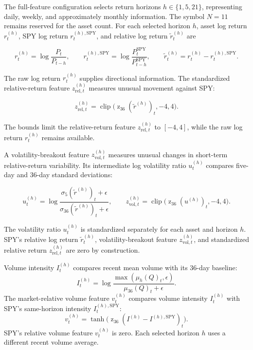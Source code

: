 The full-feature configuration selects return horizons \(h\in\{1,5,21\}\), representing daily, weekly, and approximately monthly information. The symbol \(N=11\) remains reserved for the asset count. For each selected horizon \(h\), asset log return \(r_t^{(h)}\), SPY log return \(r_t^{(h),\mathrm{SPY}}\), and relative log return \(\tilde r_t^{(h)}\) are

\begin{equation}
r_t^{(h)}=\log\frac{P_t}{P_{t-h}},\qquad
r_t^{(h),\mathrm{SPY}}=\log\frac{P_t^{\mathrm{SPY}}}{P_{t-h}^{\mathrm{SPY}}},\qquad
\tilde r_t^{(h)}=r_t^{(h)}-r_t^{(h),\mathrm{SPY}}.
\label{eq:feature-returns}
\end{equation}

The raw log return \(r_t^{(h)}\) supplies directional information. The standardized relative-return feature \(z_{\mathrm{rel},t}^{(h)}\) measures unusual movement against SPY:

\begin{equation}
z_{\mathrm{rel},t}^{(h)}=\operatorname{clip}\big(\operatorname z_{36}(\tilde r^{(h)})_t,-4,4\big).
\label{eq:feature-relative-returns}
\end{equation}

The bounds limit the relative-return feature \(z_{\mathrm{rel},t}^{(h)}\) to \([-4,4]\), while the raw log return \(r_t^{(h)}\) remains available.

A volatility-breakout feature \(z_{\mathrm{vol},t}^{(h)}\) measures unusual changes in short-term relative-return variability. Its intermediate log volatility ratio \(u_t^{(h)}\) compares five-day and 36-day standard deviations:

\begin{equation}
u_t^{(h)}=\log\frac{\sigma_5(\tilde r^{(h)})_t+\epsilon}{\sigma_{36}(\tilde r^{(h)})_t+\epsilon},\qquad
z_{\mathrm{vol},t}^{(h)}=\operatorname{clip}\big(\operatorname z_{36}(u^{(h)})_t,-4,4\big).
\label{eq:feature-vol-breakout}
\end{equation}

The volatility ratio \(u_t^{(h)}\) is standardized separately for each asset and horizon \(h\). SPY's relative log return \(\tilde r_t^{(h)}\), volatility-breakout feature \(z_{\mathrm{vol},t}^{(h)}\), and standardized relative return \(z_{\mathrm{rel},t}^{(h)}\) are zero by construction.

Volume intensity \(I_t^{(h)}\) compares recent mean volume with its 36-day baseline:
\begin{equation}
I_t^{(h)}=\log\frac{\max(\mu_h(Q)_t,\epsilon)}{\mu_{36}(Q)_t+\epsilon}.
\label{eq:feature-volume}
\end{equation}
The market-relative volume feature \(v_t^{(h)}\) compares volume intensity \(I_t^{(h)}\) with SPY's same-horizon intensity \(I_t^{(h),\mathrm{SPY}}\):
\begin{equation}
v_t^{(h)}=\tanh\!\big(\operatorname z_{36}(I^{(h)}-I^{(h),\mathrm{SPY}})_t\big).
\label{eq:feature-relative-volume}
\end{equation}
SPY's relative volume feature \(v_t^{(h)}\) is zero. Each selected horizon \(h\) uses a different recent volume average.

